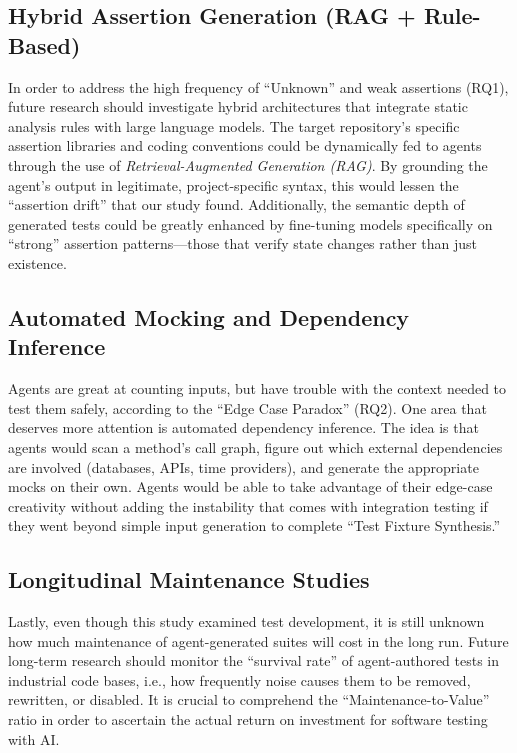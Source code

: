 \documentclass[conference]{IEEEtran}
\begin{document}
\subsection{Hybrid Assertion Generation (RAG + Rule-Based)}
In order to address the high frequency of ``Unknown'' and weak assertions (RQ1), future research should investigate hybrid architectures that integrate static analysis rules with large language models. The target repository's specific assertion libraries and coding conventions could be dynamically fed to agents through the use of \textit{Retrieval-Augmented Generation (RAG)}. By grounding the agent's output in legitimate, project-specific syntax, this would lessen the ``assertion drift'' that our study found. Additionally, the semantic depth of generated tests could be greatly enhanced by fine-tuning models specifically on ``strong'' assertion patterns—those that verify state changes rather than just existence.

\subsection{Automated Mocking and Dependency Inference}
Agents are great at counting inputs, but have trouble with the context needed to test them safely, according to the ``Edge Case Paradox'' (RQ2). One area that deserves more attention is automated dependency inference. The idea is that agents would scan a method's call graph, figure out which external dependencies are involved (databases, APIs, time providers), and generate the appropriate mocks on their own. Agents would be able to take advantage of their edge-case creativity without adding the instability that comes with integration testing if they went beyond simple input generation to complete ``Test Fixture Synthesis.''

\subsection{Longitudinal Maintenance Studies}
Lastly, even though this study examined test development, it is still unknown how much maintenance of agent-generated suites will cost in the long run. Future long-term research should monitor the ``survival rate'' of agent-authored tests in industrial code bases, i.e., how frequently noise causes them to be removed, rewritten, or disabled. It is crucial to comprehend the ``Maintenance-to-Value'' ratio in order to ascertain the actual return on investment for software testing with AI.
\end{document}
